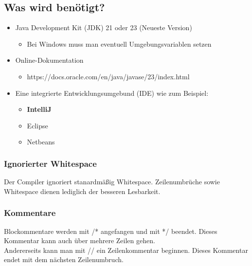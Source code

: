 \documentclass{article}
\begin{document}
	\subsection{Was wird benötigt?}
	\begin{itemize}
		\item{Java Development Kit (JDK) 21 oder 23 (Neueste Version)}
		\begin{itemize}
			\item{Bei Windows muss man eventuell Umgebungsvariablen setzen}
		\end{itemize}
		\item{Online-Dokumentation}
		\begin{itemize}
			\item{https://docs.oracle.com/en/java/javase/23/index.html}
		\end{itemize}
		\item{Eine integrierte Entwicklungsumgebund (IDE) wie zum Beispiel:}
		\begin{itemize}
			\item{\textbf{IntelliJ}}
			\item{Eclipse}
			\item{Netbeans}
		\end{itemize}
	\end{itemize}
	\subsubsection{Ignorierter Whitespace}
	Der Compiler ignoriert stanardmäßig Whitespace. Zeilenumbrüche sowie Whitespace dienen lediglich der besseren Lesbarkeit.
	\subsubsection{Kommentare}
	Blockommentare werden mit /* angefangen und mit */ beendet. Dieses Kommentar kann auch über mehrere Zeilen gehen. \\
	Andererseits kann man mit // ein Zeilenkommentar beginnen. Dieses Kommentar endet mit dem nächsten Zeilenumbruch. \\
\end{document}
